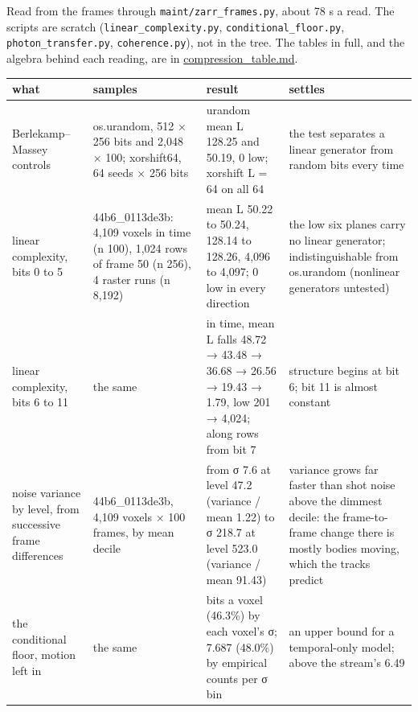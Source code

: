 Read from the frames through \texttt{maint/\allowbreak{}zarr\_\allowbreak{}frames.\allowbreak{}py}, about 78 s a read. The scripts are scratch (\texttt{linear\_\allowbreak{}complexity.\allowbreak{}py}, \texttt{conditional\_\allowbreak{}floor.\allowbreak{}py}, \texttt{photon\_\allowbreak{}transfer.\allowbreak{}py}, \texttt{coherence.\allowbreak{}py}), not in the tree. The tables in full, and the algebra behind each reading, are in \hyperref[chap:compression-table]{compression\_\allowbreak{}table.md}.

{\footnotesize
\setlength{\tabcolsep}{6pt}
\begin{longtable}{>{\RaggedRight\arraybackslash}p{}>{\RaggedRight\arraybackslash}p{}>{\RaggedRight\arraybackslash}p{}>{\RaggedRight\arraybackslash}p{}}
\toprule
what & samples & result & settles \\
\midrule
\endhead
Berlekamp–Massey controls & os.urandom, 512 × 256 bits and 2,048 × 100; xorshift64, 64 seeds × 256 bits & urandom mean L 128.25 and 50.19, 0 low; xorshift L = 64 on all 64 & the test separates a linear generator from random bits every time \\
linear complexity, bits 0 to 5 & 44b6\_\allowbreak{}0113de3b: 4,109 voxels in time (n 100), 1,024 rows of frame 50 (n 256), 4 raster runs (n 8,192) & mean L 50.22 to 50.24, 128.14 to 128.26, 4,096 to 4,097; 0 low in every direction & the low six planes carry no linear generator; indistinguishable from os.urandom (nonlinear generators untested) \\
linear complexity, bits 6 to 11 & the same & in time, mean L falls 48.72 → 43.48 → 36.68 → 26.56 → 19.43 → 1.79, low 201 → 4,024; along rows from bit 7 & structure begins at bit 6; bit 11 is almost constant \\
noise variance by level, from successive frame differences & 44b6\_\allowbreak{}0113de3b, 4,109 voxels × 100 frames, by mean decile & from σ 7.6 at level 47.2 (variance / mean 1.22) to σ 218.7 at level 523.0 (variance / mean 91.43) & variance grows far faster than shot noise above the dimmest decile: the frame-to-frame change there is mostly bodies moving, which the tracks predict \\
the conditional floor, motion left in & the same & 7.403 bits a voxel (46.3\%) by each voxel's σ; 7.687 (48.0\%) by empirical counts per σ bin & an upper bound for a temporal-only model; above the stream's 6.49 \\

\end{longtable}}
